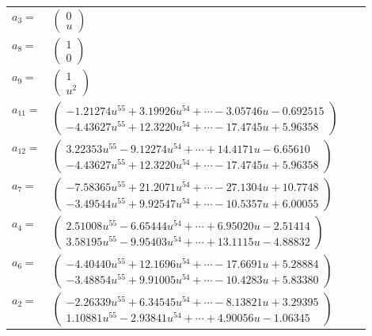 \documentclass[1p]{elsarticle_modified}
\theoremstyle{definition}
\begin{document}
\begin{tabular}{m{7pt} m{180pt} m{7pt} m{180pt} }
\flushright $a_{3}=$&$\begin{pmatrix}0\\u\end{pmatrix}$ \\
\flushright $a_{8}=$&$\begin{pmatrix}1\\0\end{pmatrix}$ \\
\flushright $a_{9}=$&$\begin{pmatrix}1\\u^2\end{pmatrix}$ \\
\flushright $a_{11}=$&$\begin{pmatrix}-1.21274 u^{55}+3.19926 u^{54}+\cdots-3.05746 u-0.692515\\-4.43627 u^{55}+12.3220 u^{54}+\cdots-17.4745 u+5.96358\end{pmatrix}$ \\
\flushright $a_{12}=$&$\begin{pmatrix}3.22353 u^{55}-9.12274 u^{54}+\cdots+14.4171 u-6.65610\\-4.43627 u^{55}+12.3220 u^{54}+\cdots-17.4745 u+5.96358\end{pmatrix}$ \\
\flushright $a_{7}=$&$\begin{pmatrix}-7.58365 u^{55}+21.2071 u^{54}+\cdots-27.1304 u+10.7748\\-3.49544 u^{55}+9.92547 u^{54}+\cdots-10.5357 u+6.00055\end{pmatrix}$ \\
\flushright $a_{4}=$&$\begin{pmatrix}2.51008 u^{55}-6.65444 u^{54}+\cdots+6.95020 u-2.51414\\3.58195 u^{55}-9.95403 u^{54}+\cdots+13.1115 u-4.88832\end{pmatrix}$ \\
\flushright $a_{6}=$&$\begin{pmatrix}-4.40440 u^{55}+12.1696 u^{54}+\cdots-17.6691 u+5.28884\\-3.48854 u^{55}+9.91005 u^{54}+\cdots-10.4283 u+5.83380\end{pmatrix}$ \\
\flushright $a_{2}=$&$\begin{pmatrix}-2.26339 u^{55}+6.34545 u^{54}+\cdots-8.13821 u+3.29395\\1.10881 u^{55}-2.93841 u^{54}+\cdots+4.90056 u-1.06345\end{pmatrix}$ \\

\end{tabular}
\end{document}

